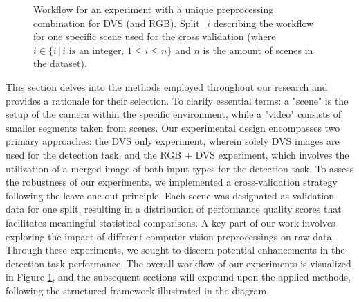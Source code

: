 \documentclass[sigchi,screen]{acmart}
\begin{document}
\begin{figure}[H]

\caption{Workflow for an experiment with a unique preprocessing combination for DVS (and RGB). Split\_$i$ describing the workflow for one specific scene used for the cross validation (where $i \in\{ i \,|\, i \text{ is an integer, } 1 \leq i \leq n \}$ and $n$ is the amount of scenes in the dataset).}
\label{fig:workflow}
\end{figure}

This section delves into the methods employed throughout our research and provides a rationale for their selection. To clarify essential terms: a "scene" is the setup of the camera within the specific environment, while a "video" consists of smaller segments taken from scenes. Our experimental design encompasses two primary approaches: the DVS only experiment, wherein solely DVS images are used for the detection task, and the RGB + DVS experiment, which involves the utilization of a merged image of both input types for the detection task. To assess the robustness of our experiments, we implemented a cross-validation strategy following the leave-one-out principle. Each scene was designated as validation data for one split, resulting in a distribution of performance quality scores that facilitates meaningful statistical comparisons. A key part of our work involves exploring the impact of different computer vision preprocessings on raw data. Through these experiments, we sought to discern potential enhancements in the detection task performance. The overall workflow of our experiments is visualized in Figure \ref{fig:workflow}, and the subsequent sections will expound upon the applied methods, following the structured framework illustrated in the diagram.
\end{document}
